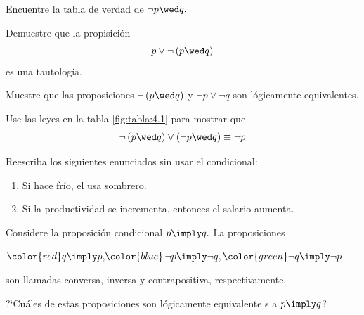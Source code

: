  \begin{problema}
  Encuentre la tabla de verdad de $\neg p \wed q.$
 \end{problema}




 \begin{problema}
  Demuestre que la propisición 
  $$
  p \vee \neg \left( p\wed q \right)
  $$ es una tautología.
 \end{problema}




 \begin{problema}
  Muestre que las proposiciones $\neg\left( p \wed q \right)$ y $\neg p \vee \neg q$ son lógicamente equivalentes.
 \end{problema}




 \begin{problema}
  Use las leyes en la tabla \ref{fig:tabla:4.1} para mostrar que 
  $$
  \neg \left( p \wed q \right) \vee \left( \neg p \wed  q \right) \equiv \neg p
  $$
 \end{problema}





 \begin{problema}
  \label{lip:sol:4.6}
  Reescriba los siguientes enunciados sin usar el condicional:
  \begin{enumerate}
   \item Si hace frío, el usa sombrero. 
   \item Si la productividad se incrementa, entonces el salario aumenta.
  \end{enumerate}

 \end{problema}




 \begin{problema}
  \label{lip:sol:4.7}
  Considere la proposición condicional $p \imply q.$ La proposiciones 
  \begin{center}
  ${\color{red}q \imply p,} {\color{blue}\, \neg p \imply \neg q,} \, {\color{green}\neg q \imply \neg p}$
  \end{center}
son llamadas {\color{red} conversa,} {\color{blue}inversa} y {\color{green} contrapositiva}, respectivamente.


?`Cuáles de estas proposiciones son lógicamente equivalente s a $p\imply q$?
 \end{problema}




